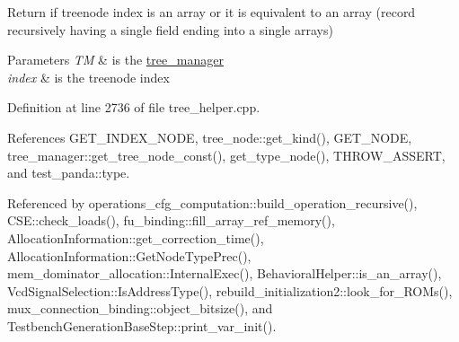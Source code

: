 Return if treenode index is an array or it is equivalent to an array (record recursively having a single field ending into a single arrays) 


\begin{DoxyParams}{Parameters}
{\em TM} & is the \hyperlink{classtree__manager}{tree\+\_\+manager} \\
\hline
{\em index} & is the treenode index \\
\hline
\end{DoxyParams}


Definition at line 2736 of file tree\+\_\+helper.\+cpp.



References G\+E\+T\+\_\+\+I\+N\+D\+E\+X\+\_\+\+N\+O\+DE, tree\+\_\+node\+::get\+\_\+kind(), G\+E\+T\+\_\+\+N\+O\+DE, tree\+\_\+manager\+::get\+\_\+tree\+\_\+node\+\_\+const(), get\+\_\+type\+\_\+node(), T\+H\+R\+O\+W\+\_\+\+A\+S\+S\+E\+RT, and test\+\_\+panda\+::type.



Referenced by operations\+\_\+cfg\+\_\+computation\+::build\+\_\+operation\+\_\+recursive(), C\+S\+E\+::check\+\_\+loads(), fu\+\_\+binding\+::fill\+\_\+array\+\_\+ref\+\_\+memory(), Allocation\+Information\+::get\+\_\+correction\+\_\+time(), Allocation\+Information\+::\+Get\+Node\+Type\+Prec(), mem\+\_\+dominator\+\_\+allocation\+::\+Internal\+Exec(), Behavioral\+Helper\+::is\+\_\+an\+\_\+array(), Vcd\+Signal\+Selection\+::\+Is\+Address\+Type(), rebuild\+\_\+initialization2\+::look\+\_\+for\+\_\+\+R\+O\+Ms(), mux\+\_\+connection\+\_\+binding\+::object\+\_\+bitsize(), and Testbench\+Generation\+Base\+Step\+::print\+\_\+var\+\_\+init().

